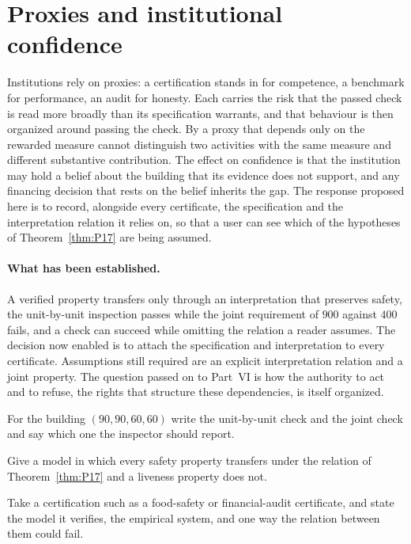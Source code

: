 \section{Proxies and institutional confidence}

Institutions rely on proxies: a certification stands in for competence, a benchmark for performance, an audit for honesty. Each carries the risk that the passed check is read more broadly than its specification warrants, and that behaviour is then organized around passing the check. By  a proxy that depends only on the rewarded measure cannot distinguish two activities with the same measure and different substantive contribution. The effect on confidence is that the institution may hold a belief about the building that its evidence does not support, and any financing decision that rests on the belief inherits the gap. The response proposed here is to record, alongside every certificate, the specification and the interpretation relation it relies on, so that a user can see which of the hypotheses of Theorem~\ref{thm:P17} are being assumed.

\paragraph{What has been established.} A verified property transfers only through an interpretation that preserves safety, the unit-by-unit inspection passes while the joint requirement of $900$ against $400$ fails, and a check can succeed while omitting the relation a reader assumes. The decision now enabled is to attach the specification and interpretation to every certificate. Assumptions still required are an explicit interpretation relation and a joint property. The question passed on to Part~VI is how the authority to act and to refuse, the rights that structure these dependencies, is itself organized.

\begin{exercise}
For the building $(90,90,60,60)$ write the unit-by-unit check and the joint check and say which one the inspector should report.
\end{exercise}
\begin{exercise}
Give a model in which every safety property transfers under the relation of Theorem~\ref{thm:P17} and a liveness property does not.
\end{exercise}
\begin{exercise}
Take a certification such as a food-safety or financial-audit certificate, and state the model it verifies, the empirical system, and one way the relation between them could fail.
\end{exercise}
